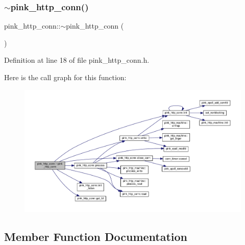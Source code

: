 \mbox{\label{classpink__http__conn_a83eb4a1a4b8afdc6bfa0959da37f0e91}} 
\subsubsection{\texorpdfstring{$\sim$pink\+\_\+http\+\_\+conn()}{~pink\_http\_conn()}}
{\footnotesize\ttfamily pink\+\_\+http\+\_\+conn\+::$\sim$pink\+\_\+http\+\_\+conn (\begin{DoxyParamCaption}{ }\end{DoxyParamCaption})\hspace{0.3cm}{\ttfamily [inline]}}



Definition at line 18 of file pink\+\_\+http\+\_\+conn.\+h.

Here is the call graph for this function\+:\nopagebreak
\begin{figure}[H]
\begin{center}
\leavevmode
\includegraphics[width=350pt]{classpink__http__conn_a83eb4a1a4b8afdc6bfa0959da37f0e91_cgraph}
\end{center}
\end{figure}


\subsection{Member Function Documentation}
\mbox{\label{classpink__http__conn_abdcd7c0da8072d62cb7212523f20298b}} 
